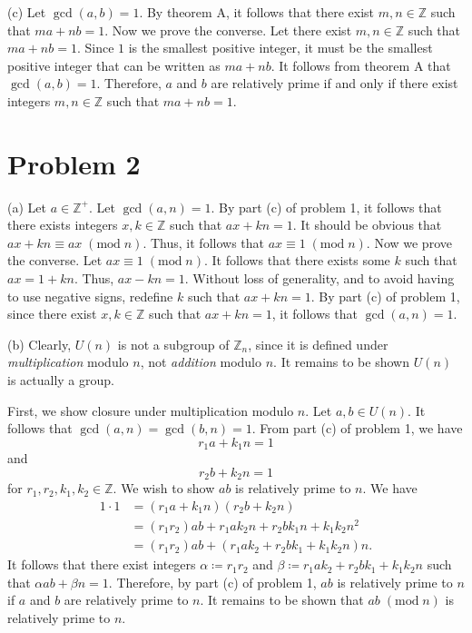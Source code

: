 \documentclass[11pt, letterpaper]{report}
\renewcommand{\mod}[1]{\;(\text{mod}\;#1)}
\renewenvironment{solution}[1][]{\begin{setsolution}}{\end{setsolution}}
\begin{document}
\begin{solution}
	(c) Let $\operatorname{gcd}(a,b) =1$. By theorem A, it follows that there exist $m,n\in \mathbb{Z}$ such that $ma+nb=1$. Now we prove the converse. Let there exist $m,n\in\mathbb{Z}$ such that $ma+nb=1$. Since $1$ is the smallest positive integer, it must be the smallest positive integer that can be written as $ma+nb$. It follows from theorem A that $\operatorname{gcd}(a,b) =1$. Therefore, $a$ and $b$ are relatively prime if and only if there exist integers $m,n\in\mathbb{Z}$ such that $ma+nb=1$.
\end{solution}
\section*{Problem 2}
\begin{solution}
	(a) Let $a\in\mathbb{Z}^+$. Let $\operatorname{gcd}(a,n) =1$. By part (c) of problem 1, it follows that there exists integers $x,k\in\mathbb{Z}$ such that $ax+kn=1$. It should be obvious that $ax+kn\equiv ax\mod{n}$. Thus, it follows that $ax\equiv 1\mod{n}$. Now we prove the converse. Let $ax\equiv 1\mod{n}$. It follows that there exists some $k$ such that $ax = 1 + kn$. Thus, $ax - kn = 1$. Without loss of generality, and to avoid having to use negative signs, redefine $k$ such that $ax + kn = 1$. By part (c) of problem 1, since there exist $x,k\in\mathbb{Z}$ such that $ax+kn=1$, it follows that $\operatorname{gcd}(a,n) =1$.

(b) Clearly, $U(n)$ is not a subgroup of $\mathbb{Z}_n$, since it is defined under \emph{multiplication} modulo $n$, not \emph{addition} modulo $n$. It remains to be shown $U(n)$ is actually a group.

First, we show closure under multiplication modulo $n$. Let $a,b\in U(n)$. It follows that $\operatorname{gcd}(a,n) =\operatorname{gcd}(b,n) =1$. From part (c) of problem 1, we have
\[
	r_1a+k_1n=1
\]
and
\[
	r_2b+k_2n=1
\]
for $r_1,r_2,k_1,k_2\in\mathbb{Z}$. We wish to show $ab$ is relatively prime to $n$. We have
\begin{align*}
	1\cdot 1&=\left( r_1a+k_1n \right) \left( r_2b+k_2n \right) \\
		&=\left( r_1r_2 \right) ab+r_1ak_2n+r_2bk_1n+k_1k_2n^2\\
		&=\left( r_1r_2 \right) ab+\left( r_1ak_2+r_2bk_1+k_1k_2n \right) n
.\end{align*}
It follows that there exist integers $\alpha \coloneqq r_1r_2$ and $\beta \coloneqq r_1ak_2+r_2bk_1+k_1k_2n$ such that $\alpha ab+\beta n=1$. Therefore, by part (c) of problem 1, $ab$ is relatively prime to $n$ if $a$ and $b$ are relatively prime to $n$. It remains to be shown that $ab\mod{n}$ is relatively prime to $n$.


\end{solution}
\end{document}
